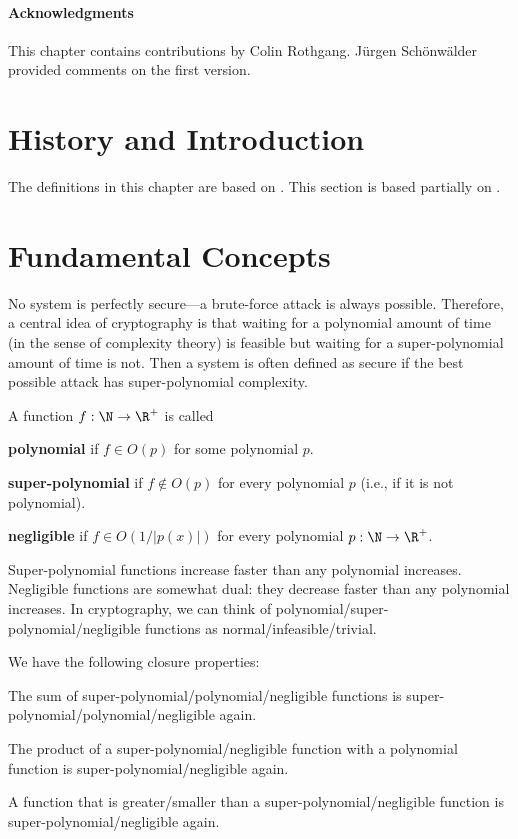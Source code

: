 \paragraph{Acknowledgments}
This chapter contains contributions by Colin Rothgang.
J\"urgen Sch\"onw\"alder provided comments on the first version.

\section{History and Introduction}\label{sec:sd:crypto:hist}
The definitions in this chapter are based on \cite{PuMaC2016}. 
This section is based partially on \cite{cryptoNetworkSlides}. 


\section{Fundamental Concepts}

No system is perfectly secure---a brute-force attack is always possible.
Therefore, a central idea of cryptography is that waiting for a polynomial amount of time (in the sense of complexity theory) is feasible but waiting for a super-polynomial amount of time is not.
Then a system is often defined as secure if the best possible attack has super-polynomial complexity.

\begin{definition}
 A function $f:\N\to\R^+$ is called
  \begin{compactitem}
   \item \textbf{polynomial} if $f\in O(p)$ for some polynomial $p$.
   \item \textbf{super-polynomial} if $f\nin O(p)$ for every polynomial $p$ (i.e., if it is not polynomial).
   \item \textbf{negligible} if $f\in O(1/|p(x)|)$ for every polynomial $p:\N\to\R^+$.
  \end{compactitem}
\end{definition}

Super-polynomial functions increase faster than any polynomial increases.
Negligible functions are somewhat dual: they decrease faster than any polynomial increases.
In cryptography, we can think of polynomial/super-polynomial/negligible functions as normal/infeasible/trivial.

\begin{theorem}
We have the following closure properties:
\begin{compactitem}
 \item The sum of super-polynomial/polynomial/negligible functions is super-polynomial/polynomial/negligible again.
 \item The product of a super-polynomial/negligible function with a polynomial function is super-polynomial/negligible again.
 \item A function that is greater/smaller than a super-polynomial/negligible function is super-polynomial/negligible again.
\end{compactitem}
\end{theorem}

